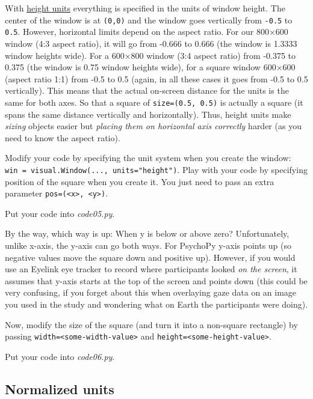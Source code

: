 \documentclass[
]{book}
\begin{document}
With \href{https://psychopy.org/general/units.html\#height-units}{height units} everything is specified in the units of window height. The center of the window is at \texttt{(0,0)} and the window goes vertically from \texttt{-0.5} to \texttt{0.5}. However, horizontal limits depend on the aspect ratio. For our 800×600 window (4:3 aspect ratio), it will go from -0.666 to 0.666 (the window is 1.3333 window heights wide). For a 600×800 window (3:4 aspect ratio) from -0.375 to 0.375 (the window is 0.75 window heights wide), for a square window 600×600 (aspect ratio 1:1) from -0.5 to 0.5 (again, in all these cases it goes from -0.5 to 0.5 vertically). This means that the actual on-screen distance for the units is the same for both axes. So that a square of \texttt{size=(0.5,\ 0.5)} is actually a square (it spans the same distance vertically and horizontally). Thus, height units make \emph{sizing} objects easier but \emph{placing them on horizontal axis correctly} harder (as you need to know the aspect ratio).

Modify your code by specifying the unit system when you create the window: \texttt{win\ =\ visual.Window(...,\ units="height")}. Play with your code by specifying position of the square when you create it. You just need to pass an extra parameter \texttt{pos=(\textless{}x\textgreater{},\ \textless{}y\textgreater{})}.

Put your code into \emph{code05.py}.

By the way, which way is up: When y is below or above zero? Unfortunately, unlike x-axis, the y-axis can go both ways. For PsychoPy y-axis points up (so negative values move the square down and positive up). However, if you would use an Eyelink eye tracker to record where participants looked \emph{on the screen}, it assumes that y-axis starts at the top of the screen and points down (this could be very confusing, if you forget about this when overlaying gaze data on an image you used in the study and wondering what on Earth the participants were doing).

Now, modify the size of the square (and turn it into a non-square rectangle) by passing \texttt{width=\textless{}some-width-value\textgreater{}} and \texttt{height=\textless{}some-height-value\textgreater{}}.

Put your code into \emph{code06.py}.

\hypertarget{psychopy-units-norm}{%
\subsection{Normalized units}\label{psychopy-units-norm}}
\end{document}
